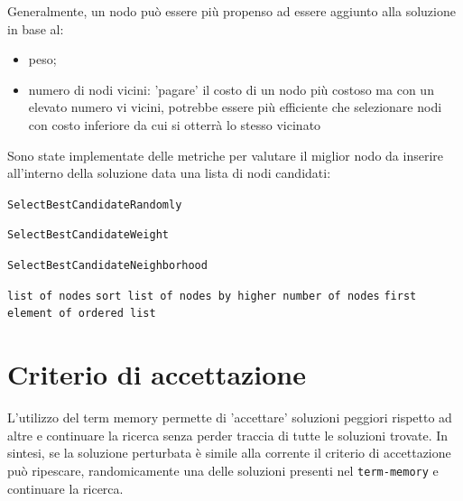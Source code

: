 \documentclass[11pt]{article}
\begin{document}
Generalmente, un nodo può essere più propenso ad essere aggiunto alla soluzione in base al:
\begin{itemize}
    \item {peso;}
    \item {numero di nodi vicini: 'pagare' il costo di un nodo più costoso ma con un elevato numero vi vicini, potrebbe essere più efficiente che selezionare nodi con costo inferiore da cui si otterrà lo stesso vicinato}
\end{itemize}

Sono state implementate delle metriche per valutare il miglior nodo da inserire all'interno della soluzione data una lista di nodi candidati:

\begin{algorithm}
\caption{\texttt{SelectBestCandidateRandomly}}
\begin{algorithmic}
    \State {}
\end{algorithmic}
\end{algorithm}

\begin{algorithm}
\caption{\texttt{SelectBestCandidateWeight}}
\begin{algorithmic}
\end{algorithmic}
\end{algorithm}

\begin{algorithm}
\caption{\texttt{SelectBestCandidateNeighborhood}}
\begin{algorithmic}
    \Require \texttt{list of nodes}
    \State \texttt{sort list of nodes by higher number of nodes}
    \State \Return \texttt{first element of ordered list}
\end{algorithmic}
\end{algorithm}

\pagebreak

\section{Criterio di accettazione}

L'utilizzo del term memory permette di 'accettare' soluzioni peggiori rispetto ad altre e continuare la ricerca senza perder traccia di tutte le soluzioni trovate.
In sintesi, se la soluzione perturbata è simile alla corrente il criterio di accettazione può ripescare, randomicamente una delle soluzioni presenti nel \verb|term-memory| e continuare la ricerca.
\end{document}
